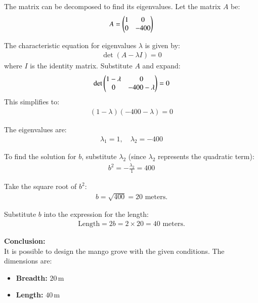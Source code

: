 \documentclass[journal]{IEEEtran}
\begin{document}
The matrix can be decomposed to find its eigenvalues. Let the matrix $A$ be:
\begin{align}
    A = \begin{pmatrix}1 & 0 \\
               0 & -400\end{pmatrix}
\end{align}

The characteristic equation for eigenvalues $\lambda$ is given by:
\begin{align}
    \det(A - \lambda I) = 0
\end{align}
where $I$ is the identity matrix. Substitute $A$ and expand:
\begin{align}
    \det\begin{pmatrix}1 - \lambda & 0 \\
                0 & -400 - \lambda\end{pmatrix} = 0
\end{align}
This simplifies to:
\begin{align}
    (1 - \lambda)(-400 - \lambda) = 0
\end{align}

The eigenvalues are:
\begin{align}
    \lambda_1 = 1, \quad \lambda_2 = -400
\end{align}

To find the solution for $b$, substitute $\lambda_2$ (since $\lambda_2$ represents the quadratic term):
\begin{align}
    b^2 = -\frac{\lambda_2}{1} = 400
\end{align}

Take the square root of $b^2$:
\begin{align}
    b = \sqrt{400} = 20 \text{ meters.}
\end{align}

Substitute $b$ into the expression for the length:
\begin{align}
    \text{Length} = 2b = 2 \times 20 = 40 \text{ meters.}
\end{align}

\textbf{Conclusion:}\\
It is possible to design the mango grove with the given conditions. The dimensions are:
\begin{itemize}
    \item \textbf{Breadth:} $20\, \text{m}$
    \item \textbf{Length:} $40\, \text{m}$
\end{itemize}
\end{document}
